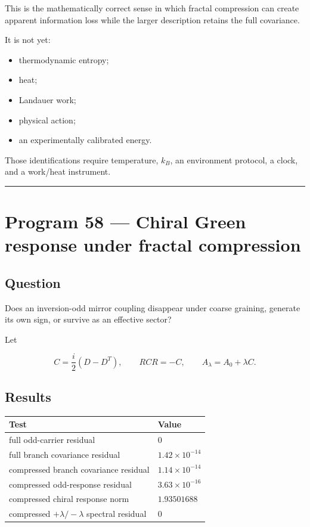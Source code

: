 \documentclass[11pt,a4paper,openany]{report}
\begin{document}
This is the mathematically correct sense in which fractal compression can create apparent information loss while the larger description retains the full covariance.

It is not yet:

\begin{itemize}
\item 
thermodynamic entropy;

\item 
heat;

\item 
Landauer work;

\item 
physical action;

\item 
an experimentally calibrated energy.

\end{itemize}

Those identifications require temperature, \(k_B\), an environment protocol, a clock, and a work/\allowbreak{}heat instrument.

\par\medskip\hrule\medskip

\chapter{Program 58 — Chiral Green response under fractal compression}

\section{Question}

Does an inversion-odd mirror coupling disappear under coarse graining, generate its own sign, or survive as an effective sector?

Let

\[
C=\frac{i}{2}(D-D^T),
\qquad
RCR=-C,
\qquad
A_\lambda=A_0+\lambda C.
\]

\section{Results}

\begin{center}
\begingroup\small
\setlength{\tabcolsep}{3.5pt}
\renewcommand{\arraystretch}{1.16}
\begin{longtable}{@{}p{}p{}@{}}
\toprule
\textbf{Test} & \textbf{Value} \\
\midrule
\endhead
full odd-carrier residual & 0 \\
full branch covariance residual & \(1.42\times10^{-14}\) \\
compressed branch covariance residual & \(1.14\times10^{-14}\) \\
compressed odd-response residual & \(3.63\times10^{-16}\) \\
compressed chiral response norm & \(1.93501688\) \\
compressed \(+\lambda/-\lambda\) spectral residual & 0 \\
\bottomrule
\end{longtable}
\endgroup
\end{center}
\end{document}

